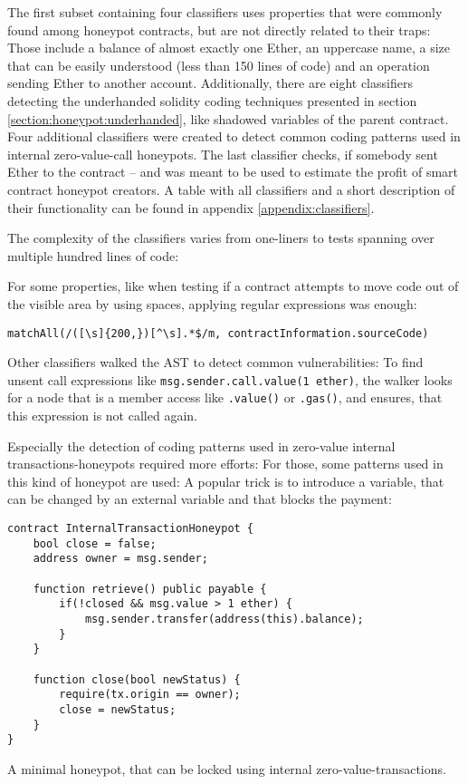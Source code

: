 The first subset containing four classifiers uses properties that were commonly found among honeypot contracts, but are not directly related to their traps: Those include a balance of almost exactly one Ether, an uppercase name, a size that can be easily understood (less than 150 lines of code) and an operation sending Ether to another account. Additionally, there are eight classifiers detecting the underhanded solidity coding techniques presented in section \ref{section:honeypot:underhanded}, like shadowed variables of the parent contract. Four additional classifiers were created to detect common coding patterns used in internal zero-value-call honeypots. The last classifier checks, if somebody sent Ether to the contract -- and was meant to be used to estimate the profit of smart contract honeypot creators. A table with all classifiers and a short description of their functionality can be found in appendix \ref{appendix:classifiers}.

The complexity of the classifiers varies from one-liners to tests spanning over multiple hundred lines of code:

For some properties, like when testing if a contract attempts to move code out of the visible area by using spaces, applying regular expressions was enough:
\begin{verbatim}
matchAll(/([\s]{200,})[^\s].*$/m, contractInformation.sourceCode)
\end{verbatim}

Other classifiers walked the AST to detect common vulnerabilities: To find unsent call expressions like \texttt{msg.sender.call.value(1 ether)}, the walker looks for a node that is a member access like \texttt{.value()} or \texttt{.gas()}, and ensures, that this expression is not called again.

Especially the detection of coding patterns used in zero-value internal transactions-honeypots required more efforts: For those, some patterns used in this kind of honeypot are used: A popular trick is to introduce a variable, that can be changed by an external variable and that blocks the payment:

\begin{listing}[H]
	\begin{verbatim}
contract InternalTransactionHoneypot {
    bool close = false;
    address owner = msg.sender;

    function retrieve() public payable {
        if(!closed && msg.value > 1 ether) {
            msg.sender.transfer(address(this).balance);
        }
    }

    function close(bool newStatus) {
        require(tx.origin == owner);
        close = newStatus;
    }
}
    \end{verbatim}
	\caption{A minimal honeypot, that can be locked using internal zero-value-transactions.}
	\label{lst:amphicyon:initializationPhase}
\end{listing}

